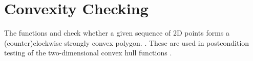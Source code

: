 \section{Convexity Checking}

The functions  and 
check whether a given sequence of 2D points forms a (counter)clockwise strongly
convex polygon.%
.  These are used in postcondition
testing of the two-dimensional convex hull functions%
.



